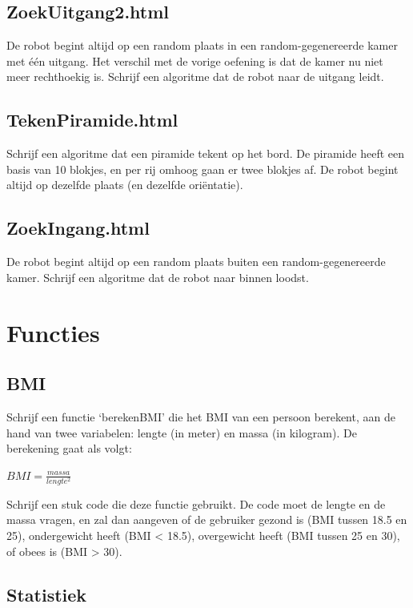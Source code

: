 \subsection{ZoekUitgang2.html}

De robot begint altijd op een random plaats in een random-gegenereerde kamer met \'e\'en uitgang. Het verschil met de vorige oefening is dat de kamer nu niet meer rechthoekig is. Schrijf een algoritme dat de robot naar de uitgang leidt.

\subsection{TekenPiramide.html}

Schrijf een algoritme dat een piramide tekent op het bord. De piramide heeft een basis van 10 blokjes, en per rij omhoog gaan er twee blokjes af. De robot begint altijd op dezelfde plaats (en dezelfde ori\"entatie).

\subsection{ZoekIngang.html}

De robot begint altijd op een random plaats buiten een random-gegenereerde kamer. Schrijf een algoritme dat de robot naar binnen loodst.

\section{Functies}

\subsection{BMI}

Schrijf een functie `berekenBMI' die het BMI van een persoon berekent, aan de hand van twee variabelen: lengte (in meter) en massa (in kilogram). De berekening gaat als volgt:

$BMI = \frac{massa}{lengte^2}$

Schrijf een stuk code die deze functie gebruikt. De code moet de lengte en de massa vragen, en zal dan aangeven of de gebruiker gezond is (BMI tussen 18.5 en 25), ondergewicht heeft (BMI < 18.5), overgewicht heeft (BMI tussen 25 en 30), of obees is (BMI > 30).

\subsection{Statistiek}


